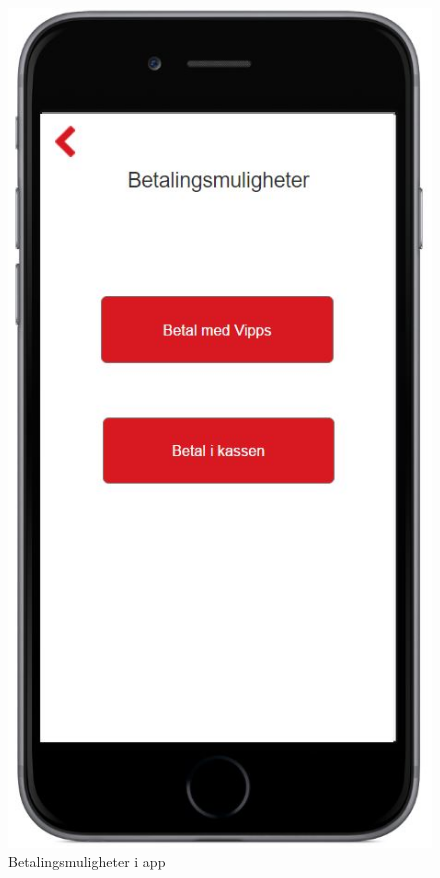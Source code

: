 \begin{figure}[H]
\includegraphics[scale=0.55]{images/axurebilder/betalingsmuligheter}
\centering %
\caption{Betalingsmuligheter i app}
\label{fig:betalingsmuligheter}
\end{figure}

